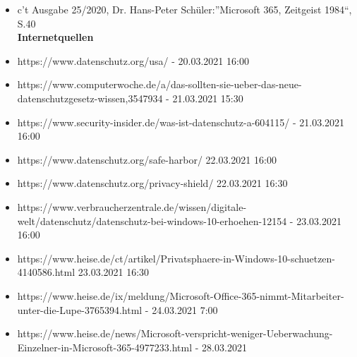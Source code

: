 \begin{itemize}[leftmargin=0.4cm]

    \item c’t Ausgabe 25/2020, Dr. Hans-Peter Schüler:”Microsoft 365, Zeitgeist 1984“, S.40
\\

\textbf{Internetquellen}

    \item https://www.datenschutz.org/usa/ - 20.03.2021 16:00
    \item https://www.computerwoche.de/a/das-sollten-sie-ueber-das-neue-datenschutzgesetz-wissen,3547934 - 21.03.2021 15:30
    \item https://www.security-insider.de/was-ist-datenschutz-a-604115/ - 21.03.2021 16:00
    \item https://www.datenschutz.org/safe-harbor/ 22.03.2021 16:00
    \item https://www.datenschutz.org/privacy-shield/ 22.03.2021 16:30
    \item https://www.verbraucherzentrale.de/wissen/digitale-welt/datenschutz/datenschutz-bei-windows-10-erhoehen-12154 - 23.03.2021 16:00
    \item https://www.heise.de/ct/artikel/Privatsphaere-in-Windows-10-schuetzen-4140586.html 23.03.2021 16:30
    \item https://www.heise.de/ix/meldung/Microsoft-Office-365-nimmt-Mitarbeiter-unter-die-Lupe-3765394.html - 24.03.2021 7:00
    \item https://www.heise.de/news/Microsoft-verspricht-weniger-Ueberwachung-Einzelner-in-Microsoft-365-4977233.html - 28.03.2021
\end{itemize}